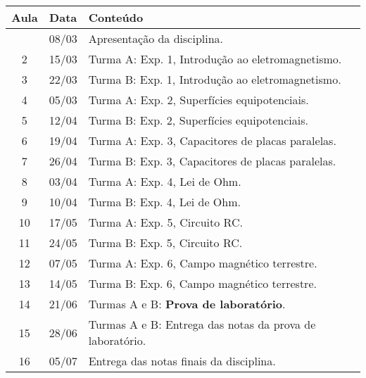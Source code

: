 \begin{center}
\begin{longtable}{ccp{70mm}}
\toprule
Aula & Data & Conteúdo \\
\midrule
\endhead
\bottomrule
\endfoot
1 & 08/03 & Apresentação da disciplina. \\
2 & 15/03 & Turma A: Exp. 1, Introdução ao eletromagnetismo. \\
3 & 22/03 & Turma B: Exp. 1, Introdução ao eletromagnetismo. \\
4 & 05/03 & Turma A: Exp. 2, Superfícies equipotenciais. \\
5 & 12/04 & Turma B: Exp. 2, Superfícies equipotenciais. \\
6 & 19/04 & Turma A: Exp. 3, Capacitores de placas paralelas. \\
7 & 26/04 & Turma B: Exp. 3, Capacitores de placas paralelas. \\
8 & 03/04 & Turma A: Exp. 4, Lei de Ohm. \\
9 & 10/04 & Turma B: Exp. 4, Lei de Ohm. \\
10 & 17/05 & Turma A: Exp. 5, Circuito RC. \\
11 & 24/05 & Turma B: Exp. 5, Circuito RC. \\
12 & 07/05 & Turma A: Exp. 6, Campo magnético terrestre. \\
13 & 14/05 & Turma B: Exp. 6, Campo magnético terrestre. \\
14 & 21/06 & Turmas A e B: \textbf{Prova de laboratório}. \\
15 & 28/06 & Turmas A e B: Entrega das notas da prova de laboratório. \\ 
16 & 05/07 & Entrega das notas finais da disciplina. \\
\end{longtable}
\end{center}

\cleardoublepage
